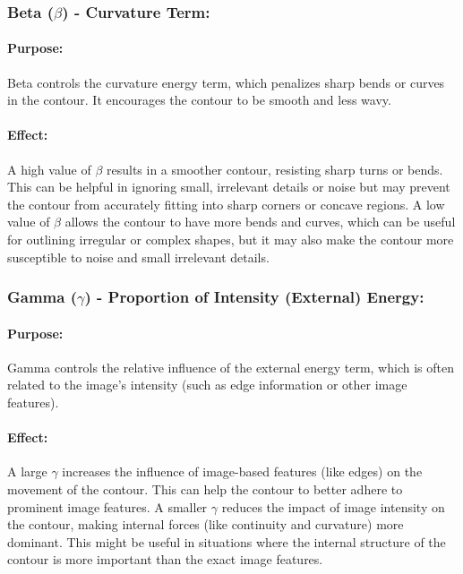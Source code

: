 \documentclass[12pt,a4paper]{report}
\begin{document}
\subsubsection*{Beta (\(\beta\)) - Curvature Term:}
\paragraph*{Purpose:} 
Beta controls the curvature energy term, which penalizes sharp bends or curves in the contour. It encourages the contour to be smooth and less wavy.
\paragraph*{Effect:}
A high value of \(\beta\) results in a smoother contour, resisting sharp turns or bends. This can be helpful in ignoring small, irrelevant details or noise but may prevent the contour from accurately fitting into sharp corners or concave regions.
A low value of \(\beta\) allows the contour to have more bends and curves, which can be useful for outlining irregular or complex shapes, but it may also make the contour more susceptible to noise and small irrelevant details.

\subsubsection*{Gamma (\(\gamma\)) -  Proportion of Intensity (External) Energy:}
\paragraph*{Purpose:} 
Gamma controls the relative influence of the external energy term, which is often related to the image's intensity (such as edge information or other image features).
\paragraph*{Effect:}
A large \(\gamma\)  increases the influence of image-based features (like edges) on the movement of the contour. This can help the contour to better adhere to prominent image features.
A smaller \(\gamma\) reduces the impact of image intensity on the contour, making internal forces (like continuity and curvature) more dominant. This might be useful in situations where the internal structure of the contour is more important than the exact image features.
\end{document}

